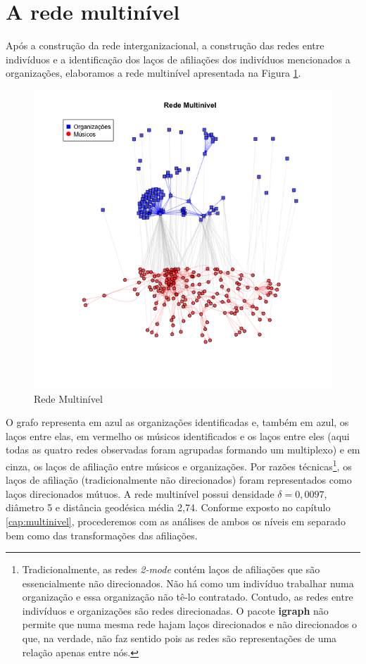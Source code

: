 \documentclass[a4paper, 12pt, openright, oneside, german, french, english, brazil]{abntex2}
\begin{document}
	
	\section{A rede multinível}
	
	Após a construção da rede interganizacional, a construção das redes entre indivíduos e a identificação dos laços de afiliações dos indivíduos mencionados a organizações, elaboramos a rede multinível apresentada na Figura \ref{rede-multinivel}.
	
	
	\begin{figure}[!ht]
		\centering
		\caption{Rede Multinível}
		\label{rede-multinivel}
		\includegraphics[scale=.7]{rede_multinivel.png}
	\end{figure}
	
	O grafo representa em azul as organizações identificadas e, também em azul, os laços entre elas, em vermelho os músicos identificados e os laços entre eles (aqui todas as quatro redes observadas foram agrupadas formando um multiplexo) e em cinza, os laços de afiliação entre músicos e organizações. Por razões técnicas\footnote{Tradicionalmente, as redes \textit{2-mode} contém laços de afiliações que são essencialmente não direcionados. Não há como um indivíduo trabalhar numa organização e essa organização não tê-lo contratado. Contudo, as redes entre indivíduos e organizações são redes direcionadas. O pacote \textbf{igraph} não permite que numa mesma rede hajam laços direcionados e não direcionados o que, na verdade, não faz sentido pois as redes são representações de uma relação apenas entre nós.}, os laços de afiliação (tradicionalmente não direcionados) foram representados como laços direcionados mútuos. A rede multinível possui densidade $\delta = 0,0097$, diâmetro 5 e distância geodésica média 2,74. Conforme exposto no capítulo \ref{cap:multinivel}, procederemos com as análises de ambos os níveis em separado bem como das transformações das afiliações.
	
\end{document}
